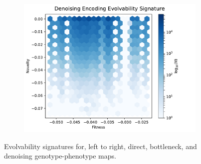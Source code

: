 \begin{figure}
\begin{subfigure}[b]{0.33\textwidth}
                \includegraphics[width=\linewidth]{img/noise_es_unscaled}
        \end{subfigure}
        \caption{Evolvability signatures for, left to right, direct, bottleneck, and denoising genotype-phenotype maps.}\label{fig:all_es}
\end{figure}
